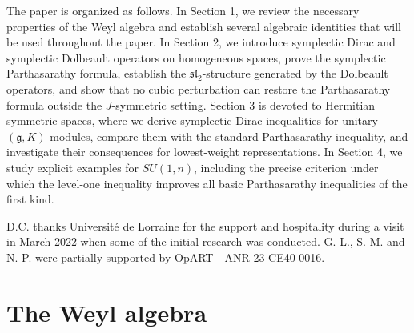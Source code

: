 \documentclass{amsart}[draft,11pt]
\numberwithin{equation}{section}
\theoremstyle{definition}
\begin{document}
\medskip

The paper is organized as follows. In Section 1, we review the necessary properties of the Weyl algebra and establish several algebraic identities that will be used throughout the paper. In Section 2, we introduce symplectic Dirac and symplectic Dolbeault operators on homogeneous spaces, prove the symplectic Parthasarathy formula, establish the $\mathfrak{sl}_2$-structure generated by the Dolbeault operators, and show that no cubic perturbation can restore the Parthasarathy formula outside the $J$-symmetric setting. Section 3 is devoted to Hermitian symmetric spaces, where we derive symplectic Dirac inequalities for unitary $(\mathfrak {g},K)$-modules, compare them with the standard Parthasarathy inequality, and investigate their consequences for lowest-weight representations. In Section 4, we study explicit examples for $SU(1,n)$, including the precise criterion under which the level-one inequality improves all basic Parthasarathy inequalities of the first kind.


\bigskip

 D.C. thanks Universit\'e de Lorraine for the support and hospitality during a visit in March 2022 when some of the initial research was conducted. G. L., S. M. and N. P. were partially supported by OpART - ANR-23-CE40-0016.



\section{The Weyl algebra}\label{s:Weyl}
\end{document}
